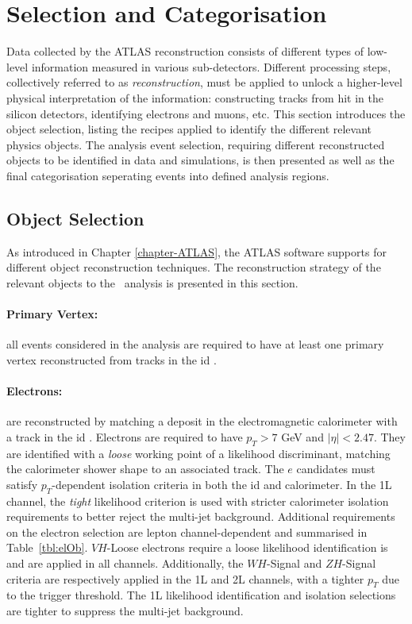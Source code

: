 
\section{Selection and Categorisation}\label{sec-selectionandcat}
Data collected by the ATLAS reconstruction consists of different types of low-level information measured in various sub-detectors. Different processing steps, collectively referred to as \textit{reconstruction}, must be applied to unlock a higher-level physical interpretation of the information: constructing tracks from hit in the silicon detectors, identifying electrons and muons, etc. This section introduces the object selection, listing the recipes applied to identify the different relevant physics objects. The analysis event selection, requiring different reconstructed objects to be identified in data and simulations, is then presented as well as the final categorisation seperating events into defined analysis regions.

\subsection{Object Selection}\label{sec-obj}%
As introduced in Chapter \ref{chapter-ATLAS}, the ATLAS software supports for different object reconstruction techniques. The reconstruction strategy of the relevant objects to the \vhbc\ analysis is presented in this section. 

\paragraph{Primary Vertex:} all events considered in the analysis are required to have at least one primary vertex reconstructed from tracks in the \gls{id} \cite{ATL-PHYS-PUB-2015-026}.

\paragraph{Electrons:} are reconstructed by matching a deposit in the electromagnetic calorimeter with a track in the \gls{id} \cite{Aaboud:2657964, Aad_2019}. Electrons are required to have $p_T > 7$ GeV and $|\eta|<2.47$. They are identified with a \textit{loose} working point of a likelihood discriminant, matching the calorimeter shower shape to an associated track. The $e$ candidates must satisfy $p_T$-dependent isolation criteria in both the \gls{id} and calorimeter. In the 1L channel, the \textit{tight} likelihood criterion is used with stricter calorimeter isolation requirements to better reject the multi-jet background. Additional requirements on the electron selection are lepton channel-dependent and summarised in Table~\ref{tbl:elOb}. $VH$-Loose electrons require a loose likelihood identification is and are applied in all channels. Additionally, the $WH$-Signal and $ZH$-Signal criteria are respectively applied in the 1L and 2L channels, with a tighter $p_T$ due to the trigger threshold. The 1L likelihood identification and isolation selections are tighter to suppress the multi-jet background. %

